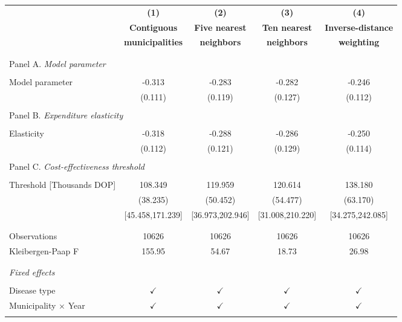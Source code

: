\begin{tabular}{l c c c c}
\toprule[1.5pt]
\multicolumn{1}{c}{\textbf{}} & \textbf{(1)} & \textbf{(2)} & \textbf{(3)} & \textbf{(4)}   \\
\multicolumn{1}{c}{\textbf{}} & \textbf{Contiguous} & \textbf{Five nearest} & \textbf{Ten nearest} & \textbf{Inverse-distance}   \\
\multicolumn{1}{c}{\textbf{}} & \textbf{municipalities} & \textbf{neighbors} & \textbf{neighbors} & \textbf{weighting}   \\ \hline \\
\\
\multicolumn{5}{l}{Panel A. \textit{Model parameter}}\\
\\
Model parameter & -0.313 & -0.283 & -0.282 & -0.246  \\
& (0.111) & (0.119)  & (0.127) & (0.112)  \\
\\
\multicolumn{5}{l}{Panel B. \textit{Expenditure elasticity}}\\
\\
Elasticity & -0.318 & -0.288 & -0.286 & -0.250  \\
& (0.112) & (0.121)  & (0.129) & (0.114)  \\
\\
\multicolumn{5}{l}{Panel C. \textit{Cost-effectiveness threshold}}\\
\\
Threshold [Thousands DOP] & 108.349 & 119.959  & 120.614 & 138.180  \\
& (38.235) & (50.452) & (54.477) & (63.170)  \\
& [45.458,171.239] & [36.973,202.946]  & [31.008,210.220]  & [34.275,242.085]   \\
\\
\midrule[1 pt]
\\
Observations & 10626 & 10626 &  10626 & 10626 \\
Kleibergen-Paap F & 155.95 & 54.67 & 18.73 & 26.98 \\
\\
\midrule[1 pt]
\\
\multicolumn{5}{l}{\textit{Fixed effects}} \\
\\
Disease type & $\checkmark$ & $\checkmark$ & $\checkmark$  & $\checkmark$ \\
Municipality $\times$ Year & $\checkmark$   &  $\checkmark$ & $\checkmark$ & $\checkmark$ \\
\\
\midrule[1 pt]
\end{tabular}
